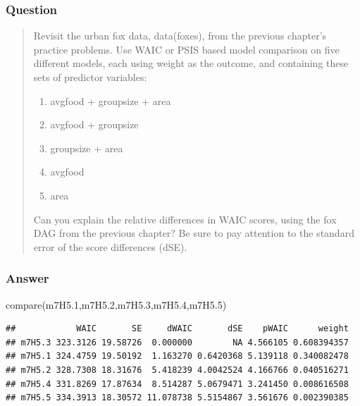 \documentclass[
]{book}
\newenvironment{Shaded}{\begin{snugshade}}{\end{snugshade}}
\newcommand{\FloatTok}[1]{\textcolor[rgb]{0.00,0.00,0.81}{#1}}
\newcommand{\FunctionTok}[1]{\textcolor[rgb]{0.00,0.00,0.00}{#1}}
\newcommand{\NormalTok}[1]{#1}
\providecommand{\tightlist}{%
  \setlength{\itemsep}{0pt}\setlength{\parskip}{0pt}}
\begin{document}
\hypertarget{question-74}{%
\subsubsection*{Question}\label{question-74}}

\begin{quote}
Revisit the urban fox data, data(foxes), from the previous chapter's practice problems. Use WAIC or PSIS based model comparison on five different models, each using weight as the outcome, and containing these sets of predictor variables:

\begin{enumerate}
\def\labelenumi{\arabic{enumi}.}
\tightlist
\item
  avgfood + groupsize + area
\item
  avgfood + groupsize
\item
  groupsize + area
\item
  avgfood
\item
  area
\end{enumerate}

Can you explain the relative differences in WAIC scores, using the fox DAG from the previous chapter? Be sure to pay attention to the standard error of the score differences (dSE).
\end{quote}

\hypertarget{answer-74}{%
\subsubsection*{Answer}\label{answer-74}}

\begin{Shaded}
\begin{Highlighting}[]
\FunctionTok{compare}\NormalTok{(m7H5}\FloatTok{.1}\NormalTok{,m7H5}\FloatTok{.2}\NormalTok{,m7H5}\FloatTok{.3}\NormalTok{,m7H5}\FloatTok{.4}\NormalTok{,m7H5}\FloatTok{.5}\NormalTok{)}
\end{Highlighting}
\end{Shaded}

\begin{verbatim}
##            WAIC       SE     dWAIC       dSE    pWAIC      weight
## m7H5.3 323.3126 19.58726  0.000000        NA 4.566105 0.608394357
## m7H5.1 324.4759 19.50192  1.163270 0.6420368 5.139118 0.340082478
## m7H5.2 328.7308 18.31676  5.418239 4.0042524 4.166766 0.040516271
## m7H5.4 331.8269 17.87634  8.514287 5.0679471 3.241450 0.008616508
## m7H5.5 334.3913 18.30572 11.078738 5.5154867 3.561676 0.002390385
\end{verbatim}
\end{document}
